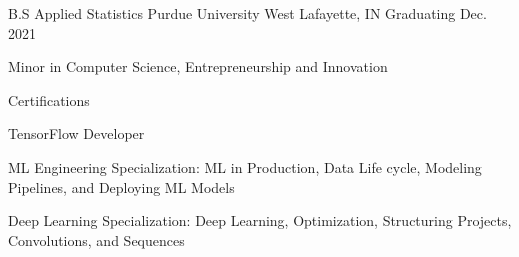 
\begin{cventries}
\edcventry
    {B.S Applied Statistics} %
    {Purdue University} %
    {West Lafayette, IN} %
    {Graduating Dec. 2021} %
    {
      \begin{cvitems} %
         \item {Minor in Computer Science, Entrepreneurship and Innovation}
      \end{cvitems}
    }

\certcventry
    {Certifications} %
    {} %
    {} %
    {} %
    {
      \begin{cvitems} %
          \item {TensorFlow Developer {}}
         \item{ML Engineering Specialization:} {ML in Production, Data Life cycle, Modeling Pipelines, and Deploying ML Models}
         \item {Deep Learning Specialization:} {Deep Learning, Optimization, Structuring Projects, Convolutions, and Sequences}
      \end{cvitems}
    }
\end{cventries}

